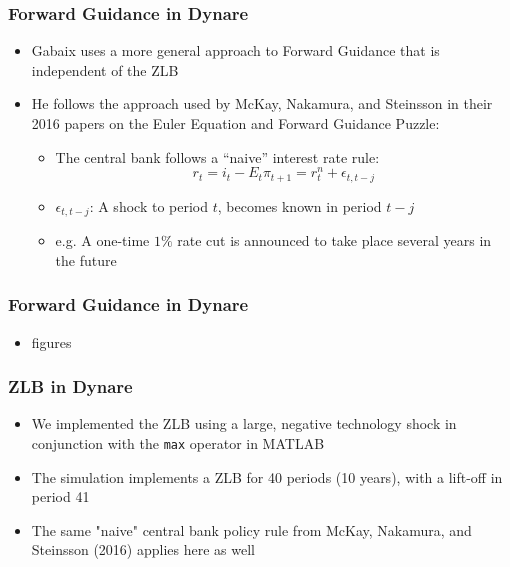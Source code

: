 \documentclass{beamer}
\begin{document}
\begin{frame}
	\frametitle{Forward Guidance in Dynare}
	\begin{itemize}
		\item Gabaix uses a more general approach to Forward Guidance that is independent of the ZLB
		\vspace{8pt}
		\item He follows the approach used by McKay, Nakamura, and Steinsson in their 2016 papers on the Euler Equation and Forward Guidance Puzzle:
		\vspace{8pt}
		\begin{itemize}
			\item The central bank follows a ``naive'' interest rate rule:\\
			$$r_{t}=i_{t}-E_{t}\pi_{t+1}=r^{n}_{t}+\epsilon_{t,t-j}$$
			\item $\epsilon_{t,t-j}$: A shock to period $t$, becomes known in period $t-j$ 
			\vspace{5pt}
			\item e.g. A one-time $1\%$ rate cut is announced to take place several years in the future
		\end{itemize}
	\end{itemize}
\end{frame}


\begin{frame}
	\frametitle{Forward Guidance in Dynare}
	\begin{itemize}
		\item figures
	\end{itemize}
\end{frame}


\begin{frame}
	\frametitle{ZLB in Dynare}
	\begin{itemize}
		\item We implemented the ZLB using a large, negative technology shock in conjunction with the \texttt{max} operator in MATLAB
		\vspace{8pt}
		\item The simulation implements a ZLB for 40 periods (10 years), with a lift-off in period 41
		\vspace{8pt}
		\item The same "naive" central bank policy rule from McKay, Nakamura, and Steinsson (2016) applies here as well
	\end{itemize}
\end{frame}
\end{document}
